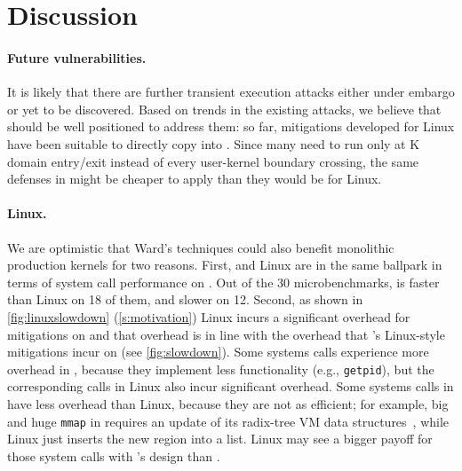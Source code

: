\section{Discussion}
\label{s:discussion}

\paragraph{Future vulnerabilities.}

It is likely that there are further transient
execution attacks either under embargo or yet to be discovered. Based on trends
in the existing attacks, we believe that \sys should be well positioned to
address them: so far, mitigations developed for Linux have been suitable to
directly copy into \sys. Since many need to run only at K domain entry/exit
instead of every user-kernel boundary crossing, the same defenses in \sys
might be cheaper to apply than they would be for Linux.

\paragraph{Linux.}


We are optimistic that Ward's techniques could also benefit monolithic
production kernels for two reasons.
First, \sys and Linux are in the same ballpark in terms of system call
performance on \bench.  Out of the 30 microbenchmarks, \sys is faster than
Linux on 18 of them, and slower on 12.
Second, as shown in \autoref{fig:linuxslowdown} (\autoref{s:motivation})
Linux incurs a significant overhead for mitigations on \bench and that
overhead is in line with the overhead that \sys's Linux-style mitigations
incur on \bench (see
\autoref{fig:slowdown}).  Some systems calls experience more overhead in
\sys, because they implement less functionality (e.g., \texttt{getpid}),
but the corresponding calls in Linux also incur significant overhead.
Some systems calls in \sys have less overhead than Linux, because they are
not as efficient; for example, big and huge \texttt{mmap} in \sys requires
an update of its radix-tree VM data structures~\cite{clements:radixvm},
while Linux just inserts the new region into a list. Linux may see a
bigger payoff for those system calls with \sys's design than \sys.

